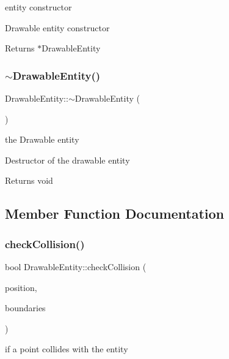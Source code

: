 entity constructor

Drawable entity constructor

\begin{DoxyReturn}{Returns}
$\ast$\+Drawable\+Entity 
\end{DoxyReturn}
\mbox{\label{class_drawable_entity_a8e70c62078d6a05b4cfc7b83c7b48859}} 
\subsubsection{\texorpdfstring{$\sim$\+Drawable\+Entity()}{~DrawableEntity()}}
{\footnotesize\ttfamily Drawable\+Entity\+::$\sim$\+Drawable\+Entity (\begin{DoxyParamCaption}{ }\end{DoxyParamCaption})}

the Drawable entity

Destructor of the drawable entity

\begin{DoxyReturn}{Returns}
void 
\end{DoxyReturn}


\subsection{Member Function Documentation}
\mbox{\label{class_drawable_entity_aa8c71a16b70006246b445b546b71a5b3}} 
\subsubsection{\texorpdfstring{check\+Collision()}{checkCollision()}}
{\footnotesize\ttfamily bool Drawable\+Entity\+::check\+Collision (\begin{DoxyParamCaption}\item[{const sf\+::\+Vector2f \&}]{position,  }\item[{const sf\+::\+Float\+Rect \&}]{boundaries }\end{DoxyParamCaption})}

if a point collides with the entity

